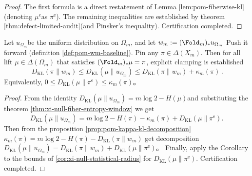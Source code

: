 \begin{proof}
The first formula is a direct restatement of Lemma \ref{lem:pom-fiberwise-kl} (denoting \(\mu^e\) ​​as \(\pi^{\mathrm{e}}\)).
The remaining inequalities are established by theorem \ref{thm:defect-limited-audit} ​​(and Pinsker’s inequality). Certification completed.
\end{proof}

\begin{corollary}\label{cor:xi-null-micro-kl-window}
Let \(u_{\Omega_m}\) ​​be the uniform distribution on \(\Omega_m\), and let
\(
w_m:=(\Fold_m)_*u_{\Omega_m}
\)
Push it forward (definition \ref{def:pom-wm-baseline}).
Pin any \(\pi\in\Delta(X_m)\).
Then for all lift \(\mu\in\Delta(\Omega_m)\) that satisfies \((\Fold_m)_*\mu=\pi\), explicit clamping is established
\[
\boxed{\;
D_{\mathrm{KL}}(\pi\|w_m)
\le D_{\mathrm{KL}}(\mu\|u_{\Omega_m})
\le D_{\mathrm{KL}}(\pi\|w_m)+\kappa_m(\pi)\; }.
\]
Equivalently,
\(
0\le D_{\mathrm{KL}}(\mu\|\pi^{\mathrm{e}})\le \kappa_m(\pi)
\)。
\end{corollary}

\begin{proof}
From the identity \(D_{\mathrm{KL}}(\mu\|u_{\Omega_m})=m\log 2-H(\mu)\) ​​and substituting the theorem \ref{thm:xi-null-fiber-entropy-window} we get
\[
D_{\mathrm{KL}}(\mu\|u_{\Omega_m})
=m\log 2-H(\pi)-\kappa_m(\pi)+D_{\mathrm{KL}}(\mu\|\pi^{\mathrm{e}}).
\]
Then from the proposition \ref{prop:pom-kappa-kl-decomposition}
\(
\kappa_m(\pi)=m\log 2-H(\pi)-D_{\mathrm{KL}}(\pi\|w_m)
\)
get decomposition
\(
D_{\mathrm{KL}}(\mu\|u_{\Omega_m})
=D_{\mathrm{KL}}(\pi\|w_m)+D_{\mathrm{KL}}(\mu\|\pi^{\mathrm{e}})
\)。
Finally, apply the Corollary to the bounds of \ref{cor:xi-null-statistical-radius} for \(D_{\mathrm{KL}}(\mu\|\pi^{\mathrm{e}})\). Certification completed.
\end{proof}

